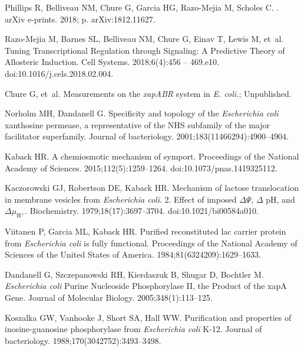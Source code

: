 \documentclass[10pt,letterpaper]{article}
\begin{document}
\begin{thebibliography}{10}
	
	{Phillips} R, {Belliveau} NM, {Chure} G, {Garcia} HG, {Razo-Mejia} M, {Scholes}
	C.
	.
	\newblock arXiv e-prints. 2018; p. arXiv:1812.11627.
	
	Razo-Mejia M, Barnes SL, Belliveau NM, Chure G, Einav T, Lewis M, et~al.
	\newblock Tuning Transcriptional Regulation through Signaling: A Predictive
	Theory of Allosteric Induction.
	\newblock Cell Systems. 2018;6(4):456 -- 469.e10.
	\newblock doi:{10.1016/j.cels.2018.02.004}.
	
	Chure G, et~al.
	\newblock Measurements on the \emph{xapABR} system in \emph{E. coli.};
	Unpublished.
	
	Norholm MH, Dandanell G.
	\newblock Specificity and topology of the \emph{Escherichia coli} xanthosine
	permease, a representative of the NHS subfamily of the major facilitator
	superfamily.
	\newblock Journal of bacteriology. 2001;183(11466294):4900--4904.
	
	Kaback HR.
	\newblock A chemiosmotic mechanism of symport.
	\newblock Proceedings of the National Academy of Sciences.
	2015;112(5):1259--1264.
	\newblock doi:{10.1073/pnas.1419325112}.
	
	Kaczorowski GJ, Robertson DE, Kaback HR.
	\newblock Mechanism of lactose translocation in membrane vesicles from
	\emph{Escherichia coli}. 2. Effect of imposed $\Delta \Psi$, $\Delta$ pH, and
	$\Delta \mu_{\mathrm{H^+}}$.
	\newblock Biochemistry. 1979;18(17):3697--3704.
	\newblock doi:{10.1021/bi00584a010}.
	
	Viitanen P, Garcia ML, Kaback HR.
	\newblock Purified reconstituted lac carrier protein from \emph{Escherichia
		coli} is fully functional.
	\newblock Proceedings of the National Academy of Sciences of the United States
	of America. 1984;81(6324209):1629--1633.
	
	Dandanell G, Szczepanowski RH, Kierdaszuk B, Shugar D, Bochtler M.
	\newblock \emph{Escherichia coli} Purine Nucleoside Phosphorylase II, the
	Product of the xapA Gene.
	\newblock Journal of Molecular Biology. 2005;348(1):113--125.
	
	Koszalka GW, Vanhooke J, Short SA, Hall WW.
	\newblock Purification and properties of inosine-guanosine phosphorylase from
	\emph{Escherichia coli} K-12.
	\newblock Journal of bacteriology. 1988;170(3042752):3493--3498.
	

\end{thebibliography}
\end{document}

